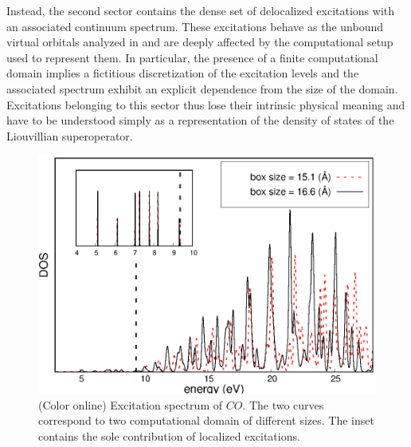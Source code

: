 \documentclass[reprint,aps,prb]{revtex4-1}
\begin{document}
Instead, the second sector contains the dense set of delocalized excitations with an associated continuum spectrum. These excitations behave as the unbound virtual orbitals analyzed in \cite{boffi2016} 
and are deeply affected by the computational setup used to represent them. In particular, the presence of a finite computational domain implies a fictitious discretization of the excitation levels and 
the associated spectrum exhibit an explicit dependence from the size of the domain. 
Excitations belonging to this sector thus lose their intrinsic physical meaning and have to be understood simply as
a representation of the density of states of the Liouvillian superoperator.

\begin{figure}[ht]
\includegraphics[scale=0.6]{CO_dos.eps}
\caption{(Color online) Excitation spectrum of $CO$. The two curves correspond to two computational domain of different sizes. The inset contains the sole contribution of localized excitations.}
\label{CO_exc}
\end{figure}
\end{document}
